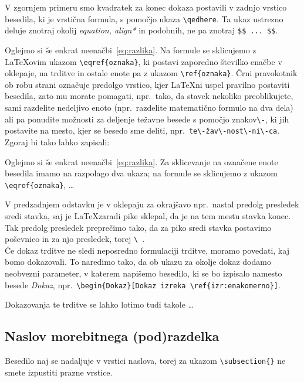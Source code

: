\documentclass[mat1]{fmfdelo}
\begin{document}
V zgornjem primeru smo kvadratek za konec dokaza postavili v zadnjo vrstico
besedila, ki je vrstična formula, s pomočjo ukaza \verb|\qedhere|.  Ta ukaz
ustrezno deluje znotraj okolij \emph{equation, align*} in podobnih, ne pa
znotraj \verb|$$ ... $$|.

Oglejmo si še enkrat neenačbi~\eqref{eq:razlika}. Na formule se sklicujemo z
\LaTeX ovim ukazom \verb|\eqref{oznaka}|, ki postavi zaporedno številko enačbe
v oklepaje, na trditve in ostale enote pa z ukazom \verb|\ref{oznaka}|. Črni
pravokotnik ob robu strani označuje predolgo vrstico, kjer \LaTeX ni uspel
pravilno postaviti besedila, zato mu morate pomagati, npr.\ tako, da stavek
nekoliko preoblikujete, sami razdelite nedeljivo enoto (npr.\ razdelite
matematično formulo na dva dela) ali pa ponudite možnosti za deljenje težavne
besede s pomočjo znakov\verb|\-|, ki jih postavite na mesto, kjer se besedo sme
deliti, npr.\  \verb|te\-žav\-nost\-ni\-ca|. Zgoraj bi tako lahko zapisali:

Oglejmo si še enkrat neenačbi~\eqref{eq:razlika}. Za sklicevanje na označene
enote besedila imamo na razpolago dva ukaza; na formule se sklicujemo z ukazom
\verb|\eqref{oznaka}|, \dots

V predzadnjem odstavku je v oklepaju za okrajšavo npr.\ nastal predolg
presledek sredi stavka, saj je \LaTeX zaradi pike sklepal, da je na tem mestu
stavka konec. Tak predolg presledek preprečimo tako, da za piko sredi stavka
postavimo poševnico in za njo presledek, torej \verb|\ |.\\

Če dokaz trditve ne sledi neposredno formulaciji trditve, moramo povedati, kaj
bomo dokazovali. To naredimo tako, da ob ukazu za okolje dokaz dodamo neobvezni
parameter,  v katerem napišemo besedilo, ki se bo izpisalo namesto besede
\emph{Dokaz}, npr.\ \verb|\begin{Dokaz}[Dokaz izreka \ref{izr:enakomerno}]|.

\begin{dokaz}
  Dokazovanja te trditve se lahko lotimo tudi takole \ldots
\end{dokaz}

\subsection{Naslov morebitnega (pod)razdelka} Besedilo naj se nadaljuje v vrstici naslova, torej za ukazom \verb|\subsection{}| ne smete izpustiti prazne vrstice.
\end{document}
